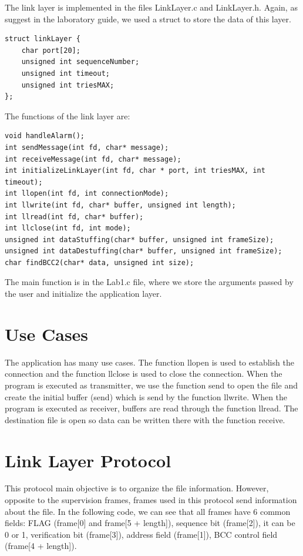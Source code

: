 \documentclass[a4paper]{article}
\begin{document}
The link layer is implemented in the files LinkLayer.c and LinkLayer.h. Again, as suggest in the laboratory guide, we used a struct to store the data of this layer. 

\begin{lstlisting}
struct linkLayer {
    char port[20];
    unsigned int sequenceNumber;
    unsigned int timeout;
    unsigned int triesMAX;
};
\end{lstlisting}

The functions of the link layer are:

\begin{lstlisting}
void handleAlarm();
int sendMessage(int fd, char* message);
int receiveMessage(int fd, char* message);
int initializeLinkLayer(int fd, char * port, int triesMAX, int timeout);
int llopen(int fd, int connectionMode);
int llwrite(int fd, char* buffer, unsigned int length);
int llread(int fd, char* buffer);
int llclose(int fd, int mode);
unsigned int dataStuffing(char* buffer, unsigned int frameSize);
unsigned int dataDestuffing(char* buffer, unsigned int frameSize);
char findBCC2(char* data, unsigned int size);
\end{lstlisting}

The main function is in the Lab1.c file, where we store the arguments passed by the user and initialize the application layer.

\section{Use Cases}

The application has many use cases. The function llopen is used to establish the connection and the function llclose is used to close the connection. When the program is executed as transmitter, we use the function send to open the file and create the initial buffer (send) which is send by the function llwrite. When the program is executed as receiver, buffers are read through the function llread. The destination file is open so data can be written there with the function receive.

\section{Link Layer Protocol}

This protocol main objective is to organize the file information. However, opposite to the supervision frames, frames used in this protocol send information about the file. In the following code, we can see that all frames have 6 common fields: FLAG (frame[0] and frame[5 + length]), sequence bit (frame[2]), it can be 0 or 1, verification bit (frame[3]), address field (frame[1]), BCC control field (frame[4 + length]).
\end{document}
